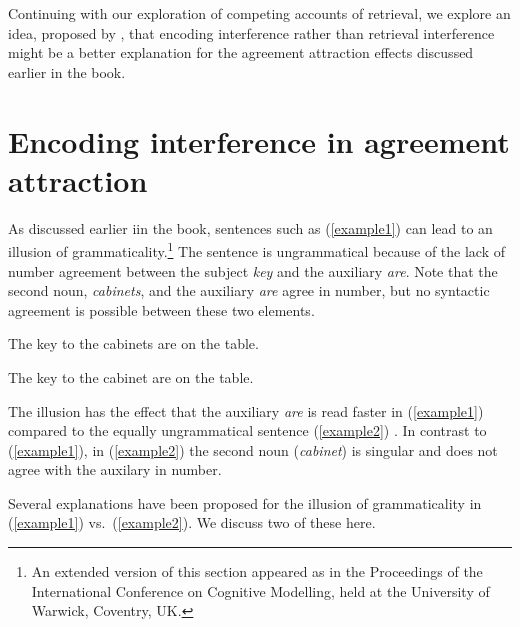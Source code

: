 \documentclass{cambridge7A}\usepackage[]{graphicx}\usepackage[]{color}
\begin{document}

Continuing with our exploration of  competing accounts of retrieval, we explore an idea, proposed by \cite{VillataFranck}, that encoding interference rather  than retrieval interference might be a better explanation for the agreement attraction effects discussed earlier in the book.

\section{Encoding interference in agreement attraction} \label{encint}

As discussed earlier iin the book, sentences such as (\ref{example1}) can lead to an illusion of grammaticality.\footnote{An  extended version of this section appeared as \cite{VasishthEtAlICCM2017} in the Proceedings of the International Conference on Cognitive Modelling, held at the University of Warwick, Coventry, UK.}
The sentence is
ungrammatical because of the lack of number agreement between
the subject \textit{key} and the auxiliary \textit{are}.
Note that the second noun, \textit{cabinets}, and the auxiliary \textit{are} agree in number, but no syntactic agreement is possible between these two elements.

\begin{exe} 
\ex
\begin{xlist}
\item \label{example1}
The key to the cabinets are on the table.
\item \label{example2}
The key to the cabinet are on the table.
\end{xlist}
\end{exe}

The illusion has the effect that
 the auxiliary \textit{are} is read faster in (\ref{example1}) compared to the equally ungrammatical sentence (\ref{example2}) \citep[see][for a review]{JaegerEngelmannVasishth2017}. In contrast to (\ref{example1}), in (\ref{example2}) the second noun (\textit{cabinet}) is singular and does not agree with the auxilary in number.

Several explanations have been proposed for the illusion of grammaticality in (\ref{example1}) vs.\ (\ref{example2}).
We discuss two of these here.
\end{document}
